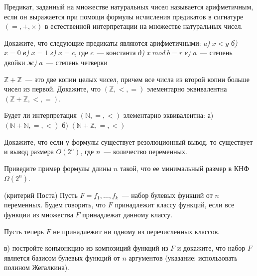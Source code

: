 \setcounter{curtask}{44}


Предикат, заданный на множестве натуральных чисел называется
арифметичным, если он выражается при помощи формулы исчисления
предикатов в сигнатуре $(=, +, \times)$ в естественной интерпретации
на множестве натуральных чисел.

\begin{task}
    Докажите, что следующие предикаты являются арифметичными:
    {\it a)} $x < y$
    {\it б)} $x = 0$
    {\it в)} $x = 1$
    {\it г)} $x = c$, где $c$~--- константа
    {\it д)} $x~mod~b = r$
    {\it е)} $a$~--- степень двойки
    {\it ж)} $a$~--- степень четверки
\end{task}

\begin{task}
	$\mathbb{Z} + \mathbb{Z}$~--- это две копии целых чисел, причем
    все числа из второй копии больше чисел из первой. Докажите, что
    $(\mathbb{Z}, <, =)$ элементарно эквивалентна $(\mathbb{Z} +
    \mathbb{Z}, <, =)$.
\end{task}

\begin{task}
    Будет ли интерпретация $(\mathbb{N}, =, <)$ элементарно
    эквивалентна:
    а) $(\mathbb{N} + \mathbb{N}, =, <)$
    б) $(\mathbb{N} + \mathbb{Z}, =, <)$
\end{task}

\breakline

\begin{ptask}{33}
    Докажите, что если у формулы существует резолюционный вывод, то
    существует и вывод размера $O(2^n)$, где $n$~--- количество переменных.
\end{ptask}

\begin{ptask}{34}
    Приведите пример формулы длины $n$ такой, что ее минимальный
    размер в КНФ $\Omega(2^n)$.
\end{ptask}

\begin{ptask}{37} (критерий Поста)
	Пусть $F = {f_1, \dots, f_k}$~--- набор булевых функций от $n$
    переменных. Будем говорить, что $F$ принадлежит классу функций,
    если все функции из множества $F$ принадлежат данному классу.
    
    Пусть теперь $F$ не принадлежит ни одному из перечисленных
    классов.

    в) постройте конъюнкцию из композиций функций из $F$ и докажите,
    что набор $F$ является базисом булевых функций от $n$ аргументов
    (указание: использовать полином Жегалкина).

\end{ptask}

